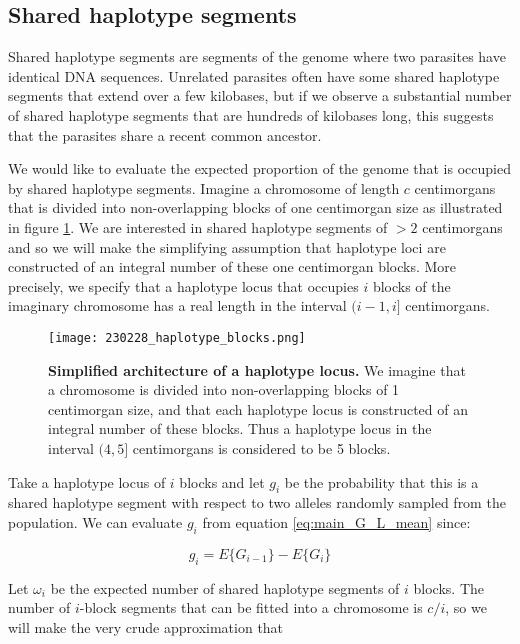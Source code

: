 \documentclass[_main.tex]{subfiles}
\begin{document}
\subsection{Shared haplotype segments}
\label{supp_shs}

Shared haplotype segments are segments of the genome where two parasites have identical DNA sequences.   Unrelated parasites often have some shared haplotype segments that extend over a few kilobases, but if we observe a substantial number of shared haplotype segments that are hundreds of kilobases long, this suggests that the parasites share a recent common ancestor.  

We would like to evaluate the expected proportion of the genome that is occupied by shared haplotype segments.  Imagine a chromosome of length $c$ centimorgans that is divided into non-overlapping blocks of one centimorgan size as illustrated in figure \ref{fig:haplotype_blocks}.  We are interested in shared haplotype segments of $> 2$ centimorgans and so we will make the simplifying assumption that haplotype loci are constructed of an integral number of these one centimorgan blocks.  More precisely, we specify that a haplotype locus that occupies $i$ blocks of the imaginary chromosome has a real length in the interval $(i-1, i]$ centimorgans.  

\begin{figure}[h!]
\centering
\texttt{[image: 230228\_haplotype\_blocks.png]}
\caption{\textbf{Simplified architecture of a haplotype locus.}  We imagine that a chromosome is divided into non-overlapping blocks of 1 centimorgan size, and that each haplotype locus is constructed of an integral number of these blocks.  Thus a haplotype locus in the interval $(4, 5]$ centimorgans is considered to be 5 blocks.  
}
\label{fig:haplotype_blocks}
\end{figure}

Take a haplotype locus of $i$ blocks and let $g_i$ be the probability that this is a shared haplotype segment with respect to two alleles randomly sampled from the population.  We can evaluate $g_i$ from equation \ref{eq:main_G_L_mean} since:

\begin{equation*}
g_i = E \{G_{i -1} \} - E \{G_{i} \}
\end{equation*}

Let $\omega_i$ be the expected number of shared haplotype segments of $i$ blocks.  The number of $i$-block segments that can be fitted into a chromosome is $c/i$, so we will make the very crude approximation that  
\end{document}

